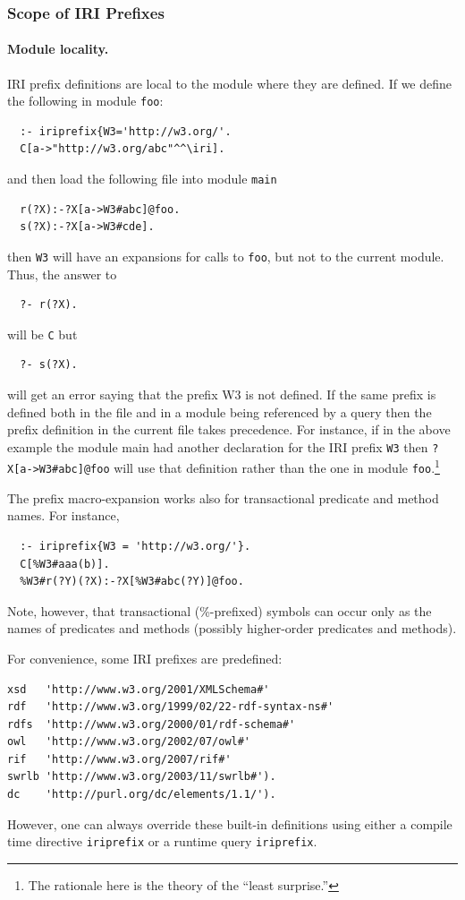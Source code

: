 \documentclass[11pt]{article}
\begin{document}
\subsubsection{Scope of IRI Prefixes}

\paragraph{Module locality.}
IRI prefix definitions are local to the module where they are
defined. If we define the following in module {\tt foo}:
\begin{verbatim}
  :- iriprefix{W3='http://w3.org/'.
  C[a->"http://w3.org/abc"^^\iri].
\end{verbatim}
and then load the following file into module {\tt main} 
\begin{verbatim}
  r(?X):-?X[a->W3#abc]@foo.
  s(?X):-?X[a->W3#cde].
\end{verbatim}
then  {\tt W3} will have an expansions for calls to \texttt{foo}, but not
to the current module. 
Thus, the answer to
\begin{verbatim}
  ?- r(?X).
\end{verbatim}
will be {\tt C} but
\begin{verbatim}
  ?- s(?X).
\end{verbatim}
will get an error saying that the prefix W3 is not defined.
If the same prefix is defined both in the file and in a module being
referenced by a query then the prefix definition in the current file takes
precedence.
For instance, if in the above example the module main had another
declaration for the IRI prefix \texttt{W3} then \texttt{?X[a->W3\#abc]@foo}
will use that definition rather than the one in module
\texttt{foo}.\footnote{
  The rationale here is the theory of the ``least surprise.''
}

The prefix macro-expansion works also for transactional predicate and
method names. For instance,
\begin{verbatim}
  :- iriprefix{W3 = 'http://w3.org/'}.
  C[%W3#aaa(b)].
  %W3#r(?Y)(?X):-?X[%W3#abc(?Y)]@foo.
\end{verbatim}
Note, however, that transactional (\%-prefixed) symbols can occur
only as the names of predicates and methods (possibly higher-order
predicates and methods).

For convenience, some IRI prefixes are predefined:
\begin{verbatim}
xsd   'http://www.w3.org/2001/XMLSchema#'
rdf   'http://www.w3.org/1999/02/22-rdf-syntax-ns#'
rdfs  'http://www.w3.org/2000/01/rdf-schema#'
owl   'http://www.w3.org/2002/07/owl#'
rif   'http://www.w3.org/2007/rif#'
swrlb 'http://www.w3.org/2003/11/swrlb#').
dc    'http://purl.org/dc/elements/1.1/').
\end{verbatim}
However, one can always override these built-in definitions using either a
compile time directive {\tt iriprefix} or a runtime query {\tt iriprefix}.
\end{document}

